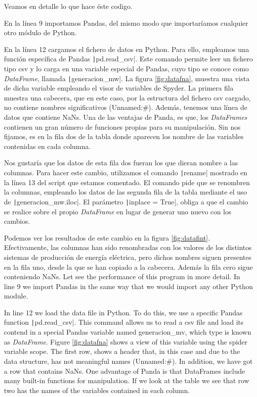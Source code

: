 \begin{paracol}{2}
 	
Veamos en detalle lo que hace éste codigo.

En la línea 9 importamos Pandas, del mismo modo que importaríamos cualquier otro módulo de Python. 

En la línea 12 cargamos el fichero de datos en Python. Para ello, empleamos una función específica de Pandas \texttt|pd.read_csv|. Este comando permite leer un fichero tipo csv y lo carga en una variable especial de Pandas, cuyo tipo se conoce como \emph{DataFrame}, llamada \texttt|generacion_mw|. La figura \ref{fig:datafna}, muestra una vista de dicha variable empleando el visor de variables de Spyder. La primera fila muestra una cabecera, que en este caso, por la estructura del fichero csv cargado, no contiene nombres significativos (Unnamed:\#). Además, tenemos una línea de datos que contiene NaNs. Una de las ventajas de Panda, es que, los \emph{DataFrames} contienen un gran número de funciones propias para su manipulación. Sin nos fijamos, es en la fila dos de la tabla donde aparecen los nombre de las variables contenidas en cada columna.

Nos gustaría que los datos de esta fila dos fueran los que dieran nombre a las columnas. Para hacer este cambio, utilizamos el comando \texttt|rename| mostrado en la línea 13 del script que estamos comentado. El comando pide que se renombren la columnas, empleando los datos de las segunda fila de la tabla mediante el uso de \texttt|generacion_mw.iloc|. El parámetro \texttt|inplace = True|, obliga a que el cambio se realice sobre el propio \emph{DataFrame} en lugar de generar uno nuevo con los cambios.

Podemos ver los resultados de este cambio en la figura \ref{fig:datafint}. Efectivamente, las columnas han sido renombradas con los valores de los distintos sistemas de producción de energía eléctrica, pero dichos nombres siguen presentes en la fila uno, desde la que se han copiado a la cabecera. Además la fila cero sigue conteniendo NaNs.
\switchcolumn
Let see the performance of this program in more detail.
In line 9 we import Pandas in the same way that we would import any other Python module.

In line 12 we load the data file in Python. To do this, we use a specific Pandas function \texttt|pd.read_csv|. This command allows us to read a csv file and load its contend in a special Pandas variable named generacion\_mv, which type is known as \emph{DataFrame}. Figure \ref{fig:datafna} shows a view of this variable using the spider variable scope. The first row, shows a header that, in this case and due to the data structure, has not meaningful names (Unnamed:\#). In addition, we have got a row that contains NaNs. One advantage of Panda is that DataFrames include many built-in functions for manipulation. If we look at the table we see that row two has the names of the variables contained in each column.


\end{paracol}

